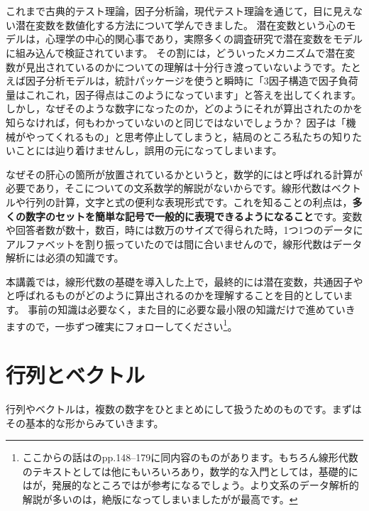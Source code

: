 \documentclass{ltjsbook}
\begin{document}
\section{}


これまで古典的テスト理論，因子分析論，現代テスト理論を通じて，目に見えない潜在変数を数値化する方法について学んできました。
潜在変数という心のモデルは，心理学の中心的関心事であり，実際多くの調査研究で潜在変数をモデルに組み込んで検証されています。
その割には，どういったメカニズムで潜在変数が見出されているのかについての理解は十分行き渡っていないようです。たとえば因子分析モデルは，統計パッケージを使うと瞬時に「3因子構造で因子負荷量はこれこれ，因子得点はこのようになっています」と答えを出してくれます。しかし，なぜそのような数字になったのか，どのようにそれが算出されたのかを知らなければ，何もわかっていないのと同じではないでしょうか？ 因子は「機械がやってくれるもの」と思考停止してしまうと，結局のところ私たちの知りたいことには辿り着けませんし，誤用の元になってしまいます。

なぜその肝心の箇所が放置されているかというと，数学的にはと呼ばれる計算が必要であり，そこについての文系数学的解説がないからです。線形代数はベクトルや行列の計算，文字と式の便利な表現形式です。これを知ることの利点は，\textbf{多くの数字のセットを簡単な記号で一般的に表現できるようになること}です。変数や回答者数が数十，数百，時には数万のサイズで得られた時，1つ1つのデータにアルファベットを割り振っていたのでは間に合いませんので，線形代数はデータ解析には必須の知識です。

本講義では，線形代数の基礎を導入した上で，最終的には潜在変数，共通因子やと呼ばれるものがどのように算出されるのかを理解することを目的としています。
事前の知識は必要なく，また目的に必要な最小限の知識だけで進めていきますので，一歩ずつ確実にフォローしてください\footnote{ここからの話は\citet{kosugi2018}のpp.148--179に同内容のものがあります。もちろん線形代数のテキストとしては他にもいろいろあり，数学的な入門としては，基礎的には\citet{Murakami20160301}が，発展的なところでは\citet{Nagata20050401}が参考になるでしょう。より文系のデータ解析的解説が多いのは，絶版になってしまいましたが\citet{Okada20080409}が最高です。}。


\section{行列とベクトル}
行列やベクトルは，複数の数字をひとまとめにして扱うためのものです。まずはその基本的な形からみていきます。
\end{document}
